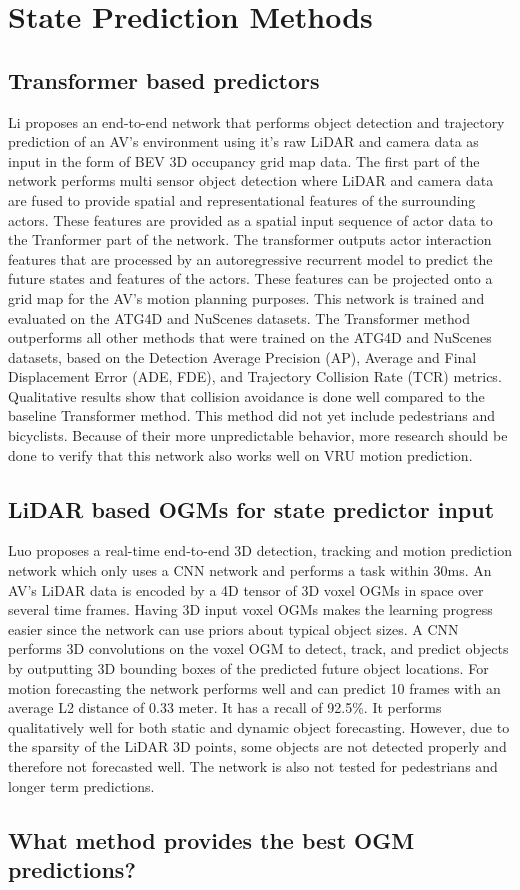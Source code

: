 \section{State Prediction Methods} \label{sec:state_methods}

\subsection{Transformer based predictors}
Li \cite{li2020end} proposes an end-to-end network that performs object detection and trajectory prediction of an AV's environment using it's raw LiDAR and camera data as input in the form of BEV 3D occupancy grid map data. The first part of the network performs multi sensor object detection where LiDAR and camera data are fused to provide spatial and representational features of the surrounding actors. These features are provided as a spatial input sequence of actor data to the Tranformer part of the network. The transformer outputs actor interaction features that are processed by an autoregressive recurrent model to predict the future states and features of the actors. These features can be projected onto a grid map for the AV's motion planning purposes. This network is trained and evaluated on the ATG4D \cite{luo2018fast} and NuScenes \cite{caesar2020nuscenes} datasets. The Transformer method outperforms all other methods that were trained on the ATG4D and NuScenes datasets, based on the Detection Average Precision (AP), Average and Final Displacement Error (ADE, FDE), and Trajectory Collision Rate (TCR) metrics. Qualitative results show that collision avoidance is done well compared to the baseline Transformer method. This method did not yet include pedestrians and bicyclists. Because of their more unpredictable behavior, more research should be done to verify that this network also works well on VRU motion prediction.

\subsection{LiDAR based OGMs for state predictor input}
Luo \cite{luo2018fast} proposes a real-time end-to-end 3D detection, tracking and motion prediction network which only uses a CNN network and performs a task within 30ms. An AV's LiDAR data is encoded by a 4D tensor of 3D voxel OGMs in space over several time frames. Having 3D input voxel OGMs makes the learning progress easier since the network can use priors about typical object sizes. A CNN performs 3D convolutions on the voxel OGM to detect, track, and predict objects by outputting 3D bounding boxes of the predicted future object locations. For motion forecasting the network performs well and can predict 10 frames with an average L2 distance of 0.33 meter. It has a recall of 92.5\%. It performs qualitatively well for both static and dynamic object forecasting. However, due to the sparsity of the LiDAR 3D points, some objects are not detected properly and therefore not forecasted well. The network is also not tested for pedestrians and longer term predictions.





\subsection{What method provides the best OGM predictions?}